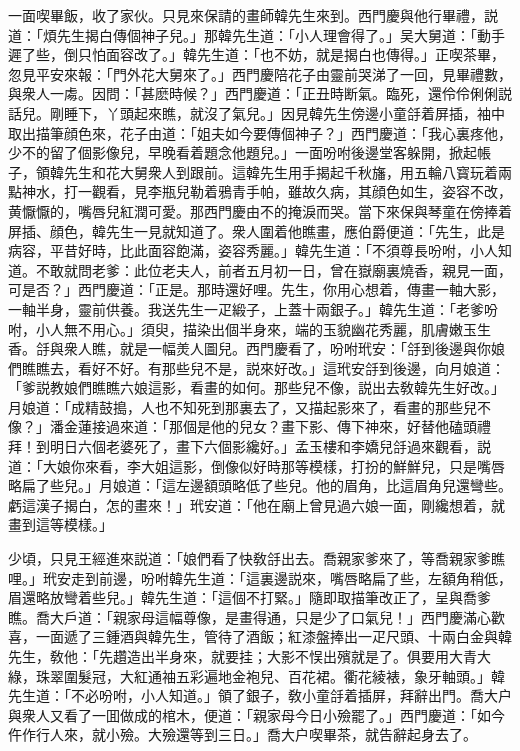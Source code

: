 一面喫畢飯，收了家伙。只見來保請的畫師韓先生來到。西門慶與他行畢禮，説道：「煩先生揭白傳個神子兒。」那韓先生道：「小人理會得了。」吴大舅道：「動手遲了些，倒只怕面容改了。」韓先生道：「也不妨，就是揭白也傳得。」正喫茶畢，忽見平安來報：「門外花大舅來了。」西門慶陪花子由靈前哭涕了一回，見畢禮數，與衆人一䖏。因問：「甚麽時候？」西門慶道：「正丑時断氣。臨死，還伶伶俐俐説話兒。剛睡下，丫頭起來瞧，就沒了氣兒。」因見韓先生傍邊小童㧱着屏插，袖中取出描筆顔色來，花子由道：「姐夫如今要傳個神子？」西門慶道：「我心裏疼他，少不的留了個影像兒，早晚看着題念他題兒。」一面吩咐後邊堂客躲開，掀起帳子，領韓先生和花大舅衆人到跟前。這韓先生用手揭起千秋旛，用五輪八寳玩着兩點神水，打一觀看，見李瓶兒勒着鴉青手帕，雖故久病，其顔色如生，姿容不改，黄懨懨的，嘴唇兒紅潤可愛。那西門慶由不的掩淚而哭。當下來保與琴童在傍捧着屏插、顔色，韓先生一見就知道了。衆人圍着他瞧畫，應伯爵便道：「先生，此是病容，平昔好時，比此面容飽滿，姿容秀麗。」韓先生道：「不須尊長吩咐，小人知道。不敢就問老爹：此位老夫人，前者五月初一日，曾在嶽廟裏燒香，親見一面，可是否？」西門慶道：「正是。那時還好哩。先生，你用心想着，傳畫一軸大影，一軸半身，靈前供養。我送先生一疋緞子，上蓋十兩銀子。」韓先生道：「老爹吩咐，小人無不用心。」須臾，描染出個半身來，端的玉貌幽花秀麗，肌膚嫩玉生香。㧱與衆人瞧，就是一幅羙人圖兒。西門慶看了，吩咐玳安：「㧱到後邊與你娘們瞧瞧去，看好不好。有那些兒不是，説來好改。」這玳安㧱到後邊，向月娘道：「爹説教娘們瞧瞧六娘這影，看畫的如何。那些兒不像，説出去敎韓先生好改。」月娘道：「成精鼓搗，人也不知死到那裏去了，又描起影來了，看畫的那些兒不像？」潘金蓮接過來道：「那個是他的兒女？畫下影、傳下神來，好替他磕頭禮拜！到明日六個老婆死了，畫下六個影纔好。」孟玉樓和李嬌兒㧱過來觀看，説道：「大娘你來看，李大姐這影，倒像似好時那等模樣，打扮的鮮鮮兒，只是嘴唇略扁了些兒。」月娘道：「這左邊額頭略低了些兒。他的眉角，比這眉角兒還彎些。虧這漢子揭白，怎的畫來！」玳安道：「他在廟上曾見過六娘一面，剛纔想着，就畫到這等模樣。」

少頃，只見王經進來説道：「娘們看了快敎㧱出去。喬親家爹來了，等喬親家爹瞧哩。」玳安走到前邊，吩咐韓先生道：「這裏邊説來，嘴唇略扁了些，左額角稍低，眉還略放彎着些兒。」韓先生道：「這個不打緊。」隨即取描筆改正了，呈與喬爹瞧。喬大戶道：「親家母這幅尊像，是畫得通，只是少了口氣兒！」西門慶滿心歡喜，一面遞了三鍾酒與韓先生，管待了酒飯；紅漆盤捧出一疋尺頭、十兩白金與韓先生，敎他：「先趲造出半身來，就要挂；大影不悮出殯就是了。俱要用大青大綠，珠翠圍髮冠，大紅通袖五彩遍地金袍兒、百花裙。衢花綾裱，象牙軸頭。」韓先生道：「不必吩咐，小人知道。」領了銀子，敎小童㧱着插屏，拜辭出門。喬大户與衆人又看了一囬做成的棺木，便道：「親家母今日小殮罷了。」西門慶道：「如今仵作行人來，就小殮。大殮還等到三日。」喬大户喫畢茶，就告辭起身去了。

